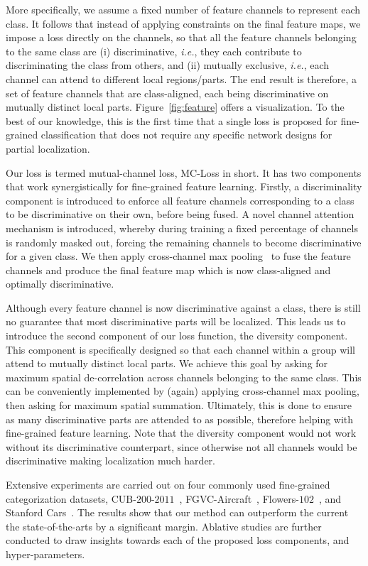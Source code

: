 \documentclass[journal]{IEEEtran}
\begin{document}
More specifically, we assume a fixed number of feature channels to represent each class. It follows that instead of applying constraints on the final feature maps, we impose a loss directly on the channels, so that all the feature channels belonging to the same class are (i) discriminative, \emph{i.e.}, they each contribute to discriminating the class from others, and (ii) mutually exclusive, \emph{i.e.}, each channel can attend to different local regions/parts. The end result is therefore, a set of feature channels that are class-aligned, each being discriminative on mutually distinct local parts. Figure~\ref{fig:feature} offers a visualization. To the best of our knowledge, this is the first time that a single loss is proposed for fine-grained classification that does not require any specific network designs for partial localization.

Our loss is termed mutual-channel loss, MC-Loss in short. It has two components that work synergistically for fine-grained feature learning. Firstly, a discriminality component is introduced to enforce all feature channels corresponding to a class to be discriminative on their own, before being fused. A novel channel attention mechanism is introduced, whereby during training a fixed percentage of channels is randomly masked out, forcing the remaining channels to become discriminative for a given class. We then apply  cross-channel max pooling~\cite{goodfellow2013maxout} to fuse the feature channels and produce the final feature map which is now class-aligned and optimally discriminative.

Although every feature channel is now discriminative against a class, there is still no guarantee that most discriminative parts will be localized. This leads us to introduce the second component of our loss function, the diversity component. This component is specifically designed so that each channel within a group will attend to mutually distinct local parts. We achieve this goal by asking for maximum spatial de-correlation across channels belonging to the same class. This can be conveniently implemented by (again) applying cross-channel max pooling, then asking for maximum spatial summation. Ultimately, this is done to ensure as many discriminative parts are attended to as possible, therefore helping with fine-grained feature learning. Note that the diversity component would not work without its discriminative counterpart, since otherwise not all channels would be discriminative making localization much harder.

Extensive experiments are carried out on four commonly used fine-grained categorization datasets, CUB-$200$-$2011$~\cite{wah2011caltech}, FGVC-Aircraft~\cite{maji2013fine}, Flowers-$102$~\cite{nilsback2008automated}, and Stanford Cars~\cite{krause20133d}. The results show that our method can outperform the current the state-of-the-arts by a significant margin. Ablative studies are further conducted to draw insights towards each of the proposed loss components, and hyper-parameters.
\end{document}

